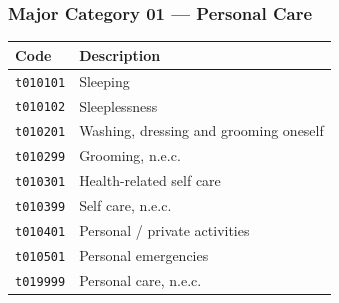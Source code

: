 \documentclass[11pt, a4paper]{article}
\begin{document}
\subsubsection*{Major Category 01 --- Personal Care}
\begin{longtable}{L{3cm} L{13cm}}
\toprule \textbf{Code} & \textbf{Description} \\ \midrule \endhead
\bottomrule \endfoot
\texttt{t010101} & Sleeping \\
 \texttt{t010102} & Sleeplessness \\
\texttt{t010201} & Washing, dressing and grooming oneself \\
 \texttt{t010299} & Grooming, n.e.c. \\
\texttt{t010301} & Health-related self care \\
 \texttt{t010399} & Self care, n.e.c. \\
\texttt{t010401} & Personal / private activities \\
 \texttt{t010501} & Personal emergencies \\
\texttt{t019999} & Personal care, n.e.c. \\
\end{longtable}
\end{document}
